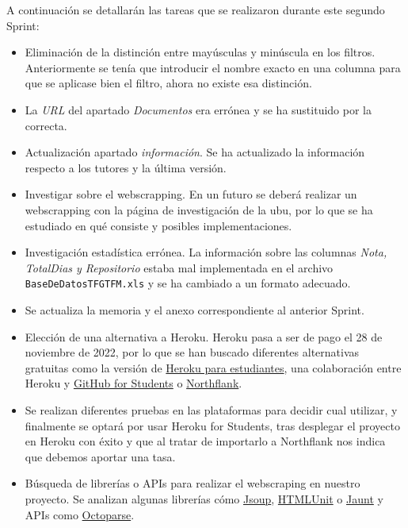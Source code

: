 A continuación se detallarán las tareas que se realizaron durante este segundo Sprint:


\begin{itemize}
	\item Eliminación de la distinción entre mayúsculas y minúscula en los filtros. Anteriormente se tenía que introducir el nombre exacto en una columna para que se aplicase bien el filtro, ahora no existe esa distinción.
	
	\item La \emph{URL} del apartado \emph{Documentos} era errónea y se ha sustituido por la correcta.
	
	\item Actualización apartado \emph{información}. Se ha actualizado la información respecto a los tutores y la última versión.
	
	\item Investigar sobre el webscrapping. En un futuro se deberá realizar un webscrapping con la página de investigación de la ubu, por lo que se ha estudiado en qué consiste y posibles implementaciones.
	
	\item Investigación estadística errónea. La información sobre las columnas \emph{Nota, TotalDias y Repositorio} estaba mal implementada en el archivo \texttt{BaseDeDatosTFGTFM.xls} y se ha cambiado a un formato adecuado.
	
	\item Se actualiza la memoria y el anexo correspondiente al anterior Sprint.
	
	\item Elección de una alternativa a Heroku. Heroku pasa a ser de pago el 28 de noviembre de 2022, por lo que se han buscado diferentes alternativas gratuitas como la versión de \href{https://blog.heroku.com/github-student-developer-program}{Heroku para estudiantes}, una colaboración entre Heroku y \href{https://education.github.com/students}{GitHub for Students} o \href{https://northflank.com/}{Northflank}. 
	
	\item Se realizan diferentes pruebas en las plataformas para decidir cual utilizar, y finalmente se optará por usar Heroku for Students, tras desplegar el proyecto en Heroku con éxito y que al tratar de importarlo a Northflank nos indica que debemos aportar una tasa.
	
	\item Búsqueda de librerías o APIs para realizar el webscraping en nuestro proyecto. Se analizan algunas librerías cómo \href{https://jsoup.org/}{Jsoup}, \href{https://htmlunit.sourceforge.io/}{HTMLUnit} o \href{https://jaunt-api.com/}{Jaunt} y APIs como \href{https://www.octoparse.es/blog/web-scraping-api-para-extraccion-de-datos}{Octoparse}.
	

\end{itemize}
